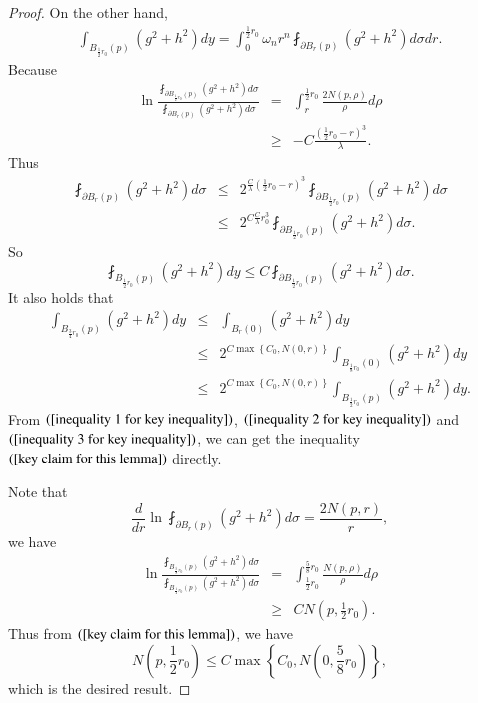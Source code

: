 \documentclass[a4paper, 12pt, onecolumn]{article} \textwidth 148mm
\begin{document}
\begin{proof}
On the other hand,
\begin{eqnarray*}
\int_{B_{\frac{1}{2}r_0}(p)}(g^2+h^2)dy=\int_0^{\frac{1}{2}r_0}\omega_nr^n\fint_{\partial B_r(p)}(g^2+h^2)d\sigma dr.
\end{eqnarray*}
Because
\begin{eqnarray*}
\ln\frac{\fint_{\partial B_{\frac{1}{2}r_0}(p)}(g^2+h^2)d\sigma}{\fint_{\partial B_r(p)}(g^2+h^2)d\sigma}
&=&\int_r^{\frac{1}{2}r_0}\frac{2N(p,\rho)}{\rho}d\rho
\\&\geq&-C\frac{(\frac{1}{2}r_0-r)^3}{\lambda}.
\end{eqnarray*}
Thus
\begin{eqnarray*}
\fint_{\partial B_r(p)}(g^2+h^2)d\sigma&\leq&2^{\frac{C}{\lambda}(\frac{1}{2}r_0-r)^3}\fint_{\partial B_{\frac{1}{2}r_0}(p)}(g^2+h^2)d\sigma
\\&\leq&2^{C\frac{C}{\lambda}r_0^3}\fint_{\partial B_{\frac{1}{2}r_0}(p)}(g^2+h^2)d\sigma.
\end{eqnarray*}
So
\begin{equation}\label{inequality 2 for key inequality}
\fint_{B_{\frac{1}{2}r_0}(p)}(g^2+h^2)dy\leq C\fint_{\partial B_{\frac{1}{2}r_0}(p)}(g^2+h^2)d\sigma.
\end{equation}
It also holds that
\begin{eqnarray}\label{inequality 3 for key inequality}
\int_{B_{\frac{3}{4}r_0}(p)}(g^2+h^2)dy&\leq&\int_{B_r(0)}(g^2+h^2)dy
\\\nonumber
&\leq&2^{C\max\left\{C_0,N(0,r)\right\}}\int_{B_{\frac{1}{8}r_0}(0)}(g^2+h^2)dy
\\\nonumber
&\leq&2^{C\max\left\{C_0,N(0,r)\right\}}\int_{B_{\frac{1}{2}r_0}(p)}(g^2+h^2)dy.
\end{eqnarray}
From $(\ref{inequality 1 for key inequality})$, $(\ref{inequality 2 for key inequality})$ and $(\ref{inequality 3 for key inequality})$, we can get the inequality $(\ref{key claim for this lemma})$ directly.

Note that
\begin{equation*}
\frac{d}{dr}\ln\fint_{\partial B_r(p)}(g^2+h^2)d\sigma=\frac{2N(p,r)}{r},
\end{equation*}
we have
\begin{eqnarray*}
\ln\frac{\fint_{B_{\frac{5}{8}r_0}(p)}(g^2+h^2)d\sigma}{\fint_{B_{\frac{1}{2}r_0}(p)}(g^2+h^2)d\sigma}
&=&\int_{\frac{1}{2}r_0}^{\frac{5}{8}r_0}\frac{N(p,\rho)}{\rho}d\rho
\\&\geq&CN(p,\frac{1}{2}r_0).
\end{eqnarray*}
Thus from $(\ref{key claim for this lemma})$, we have
\begin{equation*}
N(p,\frac{1}{2}r_0)\leq C\max\left\{C_0,N(0,\frac{5}{8}r_0)\right\},
\end{equation*}
which is the desired result.
\end{proof}
\end{document}
